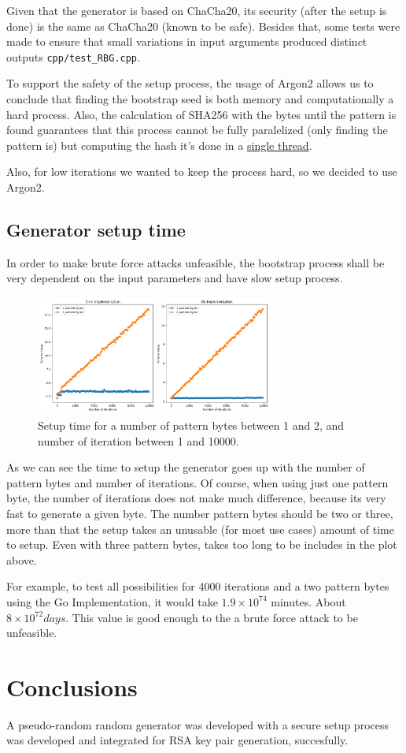 \documentclass{article} %
\begin{document}
Given that the generator is based on ChaCha20, its security (after the setup is done) is the same as ChaCha20 (known to be safe). Besides that, some tests were made to ensure that small variations in input arguments produced distinct outputs \texttt{cpp/test\_RBG.cpp}.

To support the safety of the setup process, the usage of Argon2 allows us to conclude that finding the bootstrap seed is both memory and computationally a hard process. Also, the calculation of SHA256 with the bytes until the pattern is found guarantees that this process cannot be fully paralelized (only finding the pattern is) but computing the hash it's done in a \href{https://stackoverflow.com/questions/24088295/can-sha1-sha-256-sha-512-be-broken-up-to-run-across-multiple-cores-threads}{single thread}.

Also, for low iterations we wanted to keep the process hard, so we decided to use Argon2.
\subsection{Generator setup time}
In order to make brute force attacks unfeasible, the bootstrap process shall be very dependent on the input parameters and have slow setup process.

\begin{figure}[!ht]
  \label{figure:apache_headers}
  \centering
  \includegraphics[width=0.7\textwidth]{assets/randgen_plot1.png}
  \caption{Setup time for a number of pattern bytes between 1 and 2, and number of iteration between 1 and 10000.}
\end{figure}

As we can see the time to setup the generator goes up with the number of pattern bytes and number of iterations. Of course, when using 
just one pattern byte, the number of iterations does not make much difference, because its very fast to generate a given byte. The number pattern bytes
should be two or three, more than that the setup takes an unusable (for most use cases) amount of time to setup. Even with three pattern bytes, takes too long
to be includes in the plot above.

For example, to test all possibilities for 4000 iterations and a two pattern bytes using the Go Implementation, it would take $1.9 \times 10^{74}$ minutes. About $8 \times 10^{72} days$.
This value is good enough to the a brute force attack to be unfeasible.


\section{Conclusions}
A pseudo-random random generator was developed with a secure setup process was developed and integrated for RSA key pair generation, succesfully.
\end{document}
